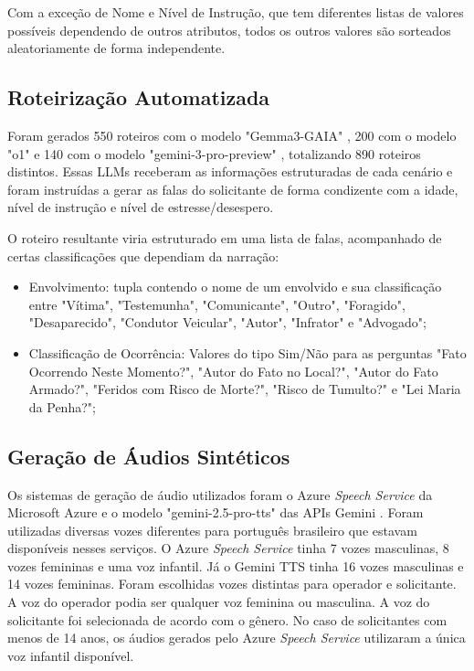 \documentclass{IEEEphot}
\begin{document}
Com a exceção de Nome e Nível de Instrução, que tem diferentes listas de valores possíveis dependendo de outros atributos, todos os outros valores são sorteados aleatoriamente de forma independente.

\subsection{Roteirização Automatizada}

Foram gerados 550 roteiros com o modelo "Gemma3-GAIA" \cite{gaia}, 200 com o modelo "o1" \cite{openai_o1} e 140 com o modelo "gemini-3-pro-preview" \cite{gemini_api}, totalizando 890 roteiros distintos. Essas LLMs receberam as informações estruturadas de cada cenário e foram instruídas a gerar as falas do solicitante de forma condizente com a idade, nível de instrução e nível de estresse/desespero. 

O roteiro resultante viria estruturado em uma lista de falas, acompanhado de certas classificações que dependiam da narração:

\begin{itemize}
    \item Envolvimento: tupla contendo o nome de um envolvido e sua classificação entre "Vítima", "Testemunha", "Comunicante", "Outro", "Foragido", "Desaparecido", "Condutor Veicular", "Autor", "Infrator" e "Advogado";
    \item Classificação de Ocorrência: Valores do tipo Sim/Não para as perguntas "Fato Ocorrendo Neste Momento?", "Autor do Fato no Local?", "Autor do Fato Armado?", "Feridos com Risco de Morte?", "Risco de Tumulto?" e "Lei Maria da Penha?";
\end{itemize}

\subsection{Geração de Áudios Sintéticos}

Os sistemas de geração de áudio utilizados foram o Azure \textit{Speech Service} da Microsoft Azure \cite{azure_speech_service} e o modelo "gemini-2.5-pro-tts" das APIs Gemini \cite{gemini_api}. Foram utilizadas diversas vozes diferentes para português brasileiro que estavam disponíveis nesses serviços. O Azure \textit{Speech Service} tinha 7 vozes masculinas, 8 vozes femininas e uma voz infantil. Já o Gemini TTS tinha 16 vozes masculinas e 14 vozes femininas. Foram escolhidas vozes distintas para operador e solicitante. A voz do operador podia ser qualquer voz feminina ou masculina. A voz do solicitante foi selecionada de acordo com o gênero. No caso de solicitantes com menos de 14 anos, os áudios gerados pelo Azure \textit{Speech Service} utilizaram a única voz infantil disponível. 
\end{document}
